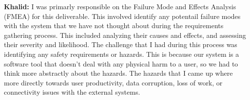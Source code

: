 \documentclass{article}
\begin{document}
\newline
\newline
\textbf{Khalid: } I was primarly responsible on the Failure Mode and Effects Analysis (FMEA) for this deliverable. This involved identify any potentail failure modes with the system that we have not thought about during the requirements gathering process. This included analyzing their causes and effects, and assessing their severity and likelihood. The challenge that I had during this process was identifying any safety requirements or hazards. This is because our system is a software tool that doesn't deal with any physical harm to a user, so we had to think more abstractly about the hazards. The hazards that I came up where more directly towards user productivity, data corruption, loss of work, or connectivity issues with the external systems.
\end{document}
